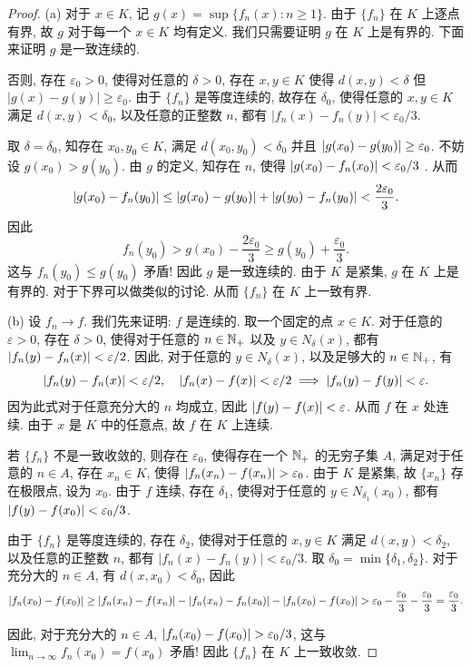 \documentclass{article}
\begin{document}
\begin{proof}
  (a) 对于 \( x\in K \), 记 \( g(x) = \sup\{f_n(x):n\ge 1\} \). 由于 \( \{f_n\} \) 在 \( K \) 上逐点有界, 故 \( g \) 对于每一个 \( x\in K \) 均有定义. 我们只需要证明 \( g \) 在 \( K \) 上是有界的. 下面来证明 \( g \) 是一致连续的.

  否则, 存在 \( \varepsilon_0>0 \), 使得对任意的 \( \delta>0 \), 存在 \( x,y\in K \) 使得 \( d(x,y)<\delta \) 但 \( |g(x)-g(y)|\ge\varepsilon_0 \). 由于 \( \{f_n\} \) 是等度连续的, 故存在 \( \delta_0 \), 使得任意的 \( x,y\in K \) 满足 \( d(x,y) < \delta_0 \), 以及任意的正整数 \( n \), 都有 \( |f_n(x)-f_n(y)|<\varepsilon_0/3 \). 
  
  取 \( \delta=\delta_0 \), 知存在 \( x_0,y_0\in K \), 满足 \( d(x_0,y_0)<\delta_0 \) 并且 \( \left|g(x_0)-g(y_0)\right| \ge \varepsilon_0 \). 不妨设 \( g(x_0) > g(y_0) \). 由 \( g \) 的定义, 知存在 \( n \), 使得 \( \left|g(x_0)-f_n(x_0)\right| < \varepsilon_0/3 \) . 从而
  \[ \left|g(x_0)-f_n(y_0)\right| \le \left|g(x_0)-g(y_0)\right| + \left|g(y_0)-f_n(y_0)\right| <\frac{2\varepsilon_0}{3}. \]
  因此
  \[ f_n(y_0) > g(x_0) - \frac{2\varepsilon_0}{3} \ge g(y_0) + \frac{\varepsilon_0}{3}. \]
  这与 \( f_n(y_0) \le g(y_0) \) 矛盾! 因此 \( g \) 是一致连续的. 由于 \( K \) 是紧集, \( g \) 在 \( K \) 上是有界的. 对于下界可以做类似的讨论. 从而 \( \{f_n\} \) 在 \( K \) 上一致有界.

  (b) 设 \( f_n\to f \). 我们先来证明: \( f \) 是连续的. 取一个固定的点 \( x\in K \). 对于任意的 \( \varepsilon>0 \), 存在 \( \delta>0 \), 使得对于任意的 \( n\in \mathbb{N}_+ \) 以及 \( y\in N_\delta(x) \), 都有 \( \left|f_n(y)-f_n(x)\right|<\varepsilon/2 \). 因此, 对于任意的 \( y\in N_\delta(x) \), 以及足够大的 \( n\in \mathbb{N}_+ \), 有
  \[ \left|f_n(y)-f_n(x)\right| < \varepsilon/2,\quad \left|f_n(x)-f(x)\right| < \varepsilon/2 \implies \left|f_n(y)-f(y)\right| < \varepsilon. \]
  因为此式对于任意充分大的 \( n \) 均成立, 因此 \( \left|f(y)-f(x)\right|<\varepsilon \). 从而 \( f \) 在 \( x \) 处连续. 由于 \( x \) 是 \( K \) 中的任意点, 故 \( f \) 在 \( K \) 上连续.
  
  若 \( \{f_n\} \) 不是一致收敛的, 则存在 \( \varepsilon_0 \), 使得存在一个 \( \mathbb{N}_+ \) 的无穷子集 \( A \), 满足对于任意的 \( n\in A \), 存在 \( x_n\in K \), 使得 \( \left|f_n(x_n)-f(x_n)\right| >\varepsilon_0 \). 由于 \( K \) 是紧集, 故 \( \{x_n\} \) 存在极限点, 设为 \( x_0 \). 由于 \( f \) 连续, 存在 \( \delta_1 \), 使得对于任意的 \( y\in N_{\delta_1}(x_0) \), 都有 \( \left|f(y)-f(x_0)\right|<\varepsilon_0/3 \).

  由于 \( \{f_n\} \) 是等度连续的, 存在 \( \delta_2 \), 使得对于任意的 \( x,y\in K \) 满足 \( d(x,y)<\delta_2 \), 以及任意的正整数 \( n \), 都有 \( |f_n(x)-f_n(y)|<\varepsilon_0/3 \). 取 \( \delta_0=\min\{\delta_1,\delta_2\} \). 对于充分大的 \( n\in A \), 有 \( d(x,x_0)<\delta_0 \), 因此 
  \[ \left|f_n(x_0)-f(x_0)\right| \ge \left|f_n(x_n)-f(x_n)\right| - \left|f_n(x_n)-f_n(x_0)\right| - \left|f_n(x_0)-f(x_0)\right| > \varepsilon_0 - \frac{\varepsilon_0}{3} - \frac{\varepsilon_0}{3} = \frac{\varepsilon_0}{3}. \]

  因此, 对于充分大的 \( n\in A \), \( \left|f_n(x_0)-f(x_0)\right| > \varepsilon_0/3 \), 这与 \( \lim_{n\to\infty} f_n(x_0) = f(x_0) \) 矛盾! 因此 \( \{f_n\} \) 在 \( K \) 上一致收敛.
\end{proof}
\end{document}
